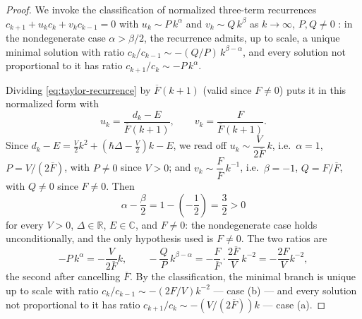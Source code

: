 \documentclass[11pt]{article}
\theoremstyle{remark}
\begin{document}
\begin{proof}
We invoke the classification of normalized three-term recurrences
\(c_{k+1}+u_kc_k+v_kc_{k-1}=0\) with \(u_k\sim P\,k^\alpha\) and
\(v_k\sim Q\,k^\beta\) as \(k\to\infty\), \(P,Q\ne0\)
\cite[Theorem~2.3(a)]{Gautschi1967Recurrence}: in the nondegenerate case
\(\alpha>\beta/2\), the recurrence admits, up to scale, a unique minimal
solution with ratio \(c_k/c_{k-1}\sim-(Q/P)\,k^{\beta-\alpha}\), and every
solution not proportional to it has ratio \(c_{k+1}/c_k\sim-P\,k^\alpha\).

Dividing \eqref{eq:taylor-recurrence} by \(\overline F(k+1)\) (valid since
\(F\ne0\)) puts it in this normalized form with
\begin{equation}
 u_k=\frac{d_k-E}{\overline F(k+1)},\qquad
 v_k=\frac F{\overline F(k+1)}.
\end{equation}
Since \(d_k-E=\tfrac V2k^2+(\hbar\Delta-\tfrac V2)k-E\), we read off
\(u_k\sim\dfrac V{2\overline F}\,k\), i.e.\ \(\alpha=1\),
\(P=V/(2\overline F)\), with \(P\ne0\) since \(V>0\); and
\(v_k\sim\dfrac F{\overline F}\,k^{-1}\), i.e.\ \(\beta=-1\),
\(Q=F/\overline F\), with \(Q\ne0\) since \(F\ne0\).  Then
\begin{equation}
 \alpha-\frac\beta2=1-\left(-\frac12\right)=\frac32>0
\end{equation}
for every \(V>0\), \(\Delta\in\mathbb R\), \(E\in\mathbb C\), and
\(F\ne0\): the nondegenerate case holds unconditionally, and the only
hypothesis used is \(F\ne0\).  The two ratios are
\begin{equation}
 -P\,k^\alpha=-\frac V{2\overline F}k,
 \qquad
 -\frac QP\,k^{\beta-\alpha}
 =-\frac F{\overline F}\cdot\frac{2\overline F}V\,k^{-2}
 =-\frac{2F}Vk^{-2},
\end{equation}
the second after cancelling \(\overline F\).  By the classification, the
minimal branch is unique up to scale with ratio
\(c_k/c_{k-1}\sim-(2F/V)k^{-2}\) --- case (b) --- and every solution not
proportional to it has ratio \(c_{k+1}/c_k\sim-(V/(2\overline F))k\) ---
case (a).
\end{proof}
\end{document}
